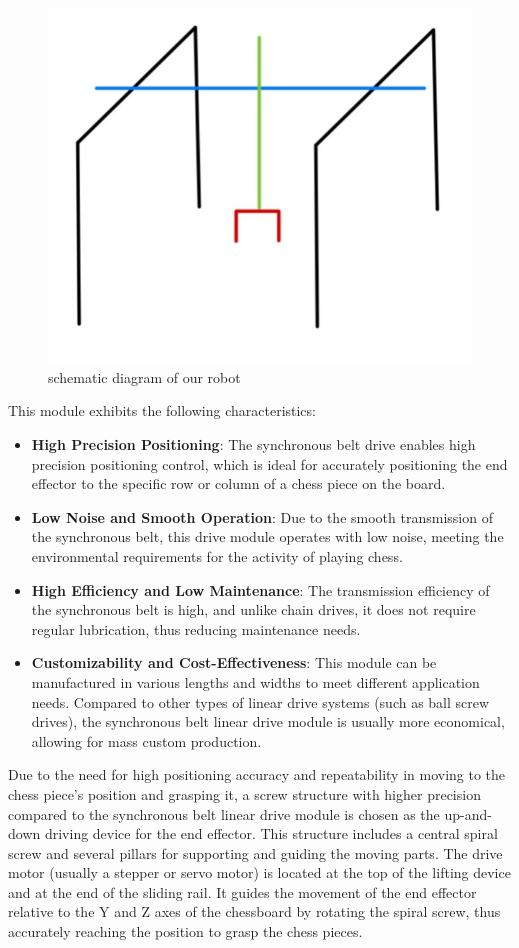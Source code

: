 \documentclass[10pt, a4paper, twocolumn]{article}
\begin{document}
\begin{figure}
    \centering
    \includegraphics[width=0.5\linewidth]{schematic diagram.jpg}
    \caption{schematic diagram of our robot}
    \label{fig:schematic diagram}
\end{figure}

This module exhibits the following characteristics:

\begin{itemize}
    \item \textbf{High Precision Positioning}: The synchronous belt drive enables high precision positioning control, which is ideal for accurately positioning the end effector to the specific row or column of a chess piece on the board.
    \item \textbf{Low Noise and Smooth Operation}: Due to the smooth transmission of the synchronous belt, this drive module operates with low noise, meeting the environmental requirements for the activity of playing chess.
    \item \textbf{High Efficiency and Low Maintenance}: The transmission efficiency of the synchronous belt is high, and unlike chain drives, it does not require regular lubrication, thus reducing maintenance needs.
    \item \textbf{Customizability and Cost-Effectiveness}: This module can be manufactured in various lengths and widths to meet different application needs. Compared to other types of linear drive systems (such as ball screw drives), the synchronous belt linear drive module is usually more economical, allowing for mass custom production.
\end{itemize}

Due to the need for high positioning accuracy and repeatability in moving to the chess piece's position and grasping it, a screw structure with higher precision compared to the synchronous belt linear drive module is chosen as the up-and-down driving device for the end effector. This structure includes a central spiral screw and several pillars for supporting and guiding the moving parts. The drive motor (usually a stepper or servo motor) is located at the top of the lifting device and at the end of the sliding rail. It guides the movement of the end effector relative to the Y and Z axes of the chessboard by rotating the spiral screw, thus accurately reaching the position to grasp the chess pieces.
\end{document}
